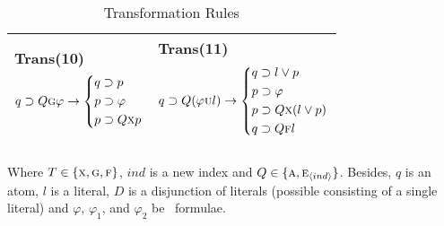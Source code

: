 \documentclass[letterpaper]{article} %
\begin{document}
\begin{table*}[]
\begin{tabular}{l l}
  \textbf{Trans(10)} $$ q\supset Q\textsc{g} \varphi \rightarrow  \left\{
 \begin{aligned}
 & q \supset  p\\
 & p\supset \varphi\\
 & p\supset Q\textsc{x} p
   \end{aligned} 
   \right.
  $$ & \textbf{Trans(11)} $$ q\supset Q(\varphi \textsc{u} l) \rightarrow  \left\{
 \begin{aligned}
  & q \supset l\vee p\\
  & p\supset \varphi\\
  & p\supset Q\textsc{x}(l\vee p)\\
  & q\supset Q \textsc{f} l
   \end{aligned} 
   \right.
  $$\\
  \hline
    \end{tabular}
    \caption{Transformation Rules}
    \label{tab:trans}
    Where $T\in \{\textsc{x}, \textsc{g}, \textsc{f}\}$, 
    $ind$ is a new index and $Q\in \{\textsc{a}, \textsc{e}_{{\langle{ind}\rangle}}\}$. Besides, $q$ is an atom, $l$ is a literal, $D$ is a disjunction of literals (possible consisting of a single literal) and $\varphi$, $\varphi_1$, and $\varphi_2$ be \CTL\ formulae.
\end{table*}


\end{document}
